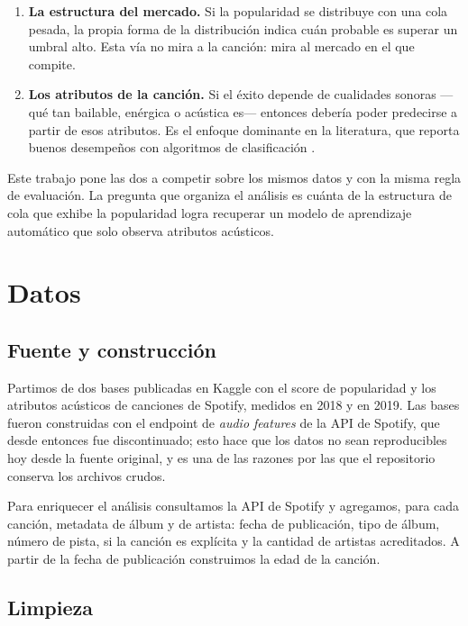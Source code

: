 \documentclass[11pt,a4paper]{article}
\begin{document}
\begin{enumerate}
  \item \textbf{La estructura del mercado.} Si la popularidad se distribuye
        con una cola pesada, la propia forma de la distribución indica cuán
        probable es superar un umbral alto. Esta vía no mira a la canción:
        mira al mercado en el que compite.
  \item \textbf{Los atributos de la canción.} Si el éxito depende de
        cualidades sonoras ---qué tan bailable, enérgica o acústica es---
        entonces debería poder predecirse a partir de esos atributos. Es el
        enfoque dominante en la literatura, que reporta buenos desempeños con
        algoritmos de clasificación
        \citep{pareek2022,saragih2023,dimolitsas2023}.
\end{enumerate}

Este trabajo pone las dos a competir sobre los mismos datos y con la misma
regla de evaluación. La pregunta que organiza el análisis es cuánta de la
estructura de cola que exhibe la popularidad logra recuperar un modelo de
aprendizaje automático que solo observa atributos acústicos.

\section{Datos}

\subsection{Fuente y construcción}

Partimos de dos bases publicadas en Kaggle \citep{kaggle_spotify} con el
score de popularidad y los atributos acústicos de canciones de Spotify,
medidos en 2018 y en 2019. Las bases fueron construidas con el endpoint de
\textit{audio features} de la API de Spotify, que desde entonces fue
discontinuado; esto hace que los datos no sean reproducibles hoy desde la
fuente original, y es una de las razones por las que el repositorio conserva
los archivos crudos.

Para enriquecer el análisis consultamos la API de Spotify y agregamos, para
cada canción, metadata de álbum y de artista: fecha de publicación, tipo de
álbum, número de pista, si la canción es explícita y la cantidad de artistas
acreditados. A partir de la fecha de publicación construimos la edad de la
canción.

\subsection{Limpieza}
\end{document}
